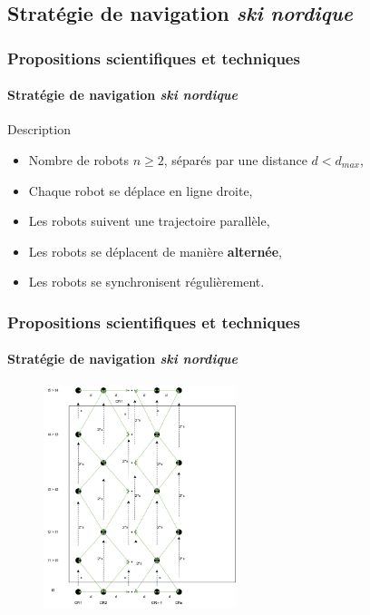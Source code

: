 \documentclass{beamer}
\begin{document}
		\subsection{Stratégie de navigation \textit{ski nordique}}
			\begin{frame}
				\frametitle{Propositions scientifiques et techniques}
				\framesubtitle{Stratégie de navigation \textit{ski nordique}}
				\begin{block}{Description}
					\begin{itemize}
						\item Nombre de robots $n \ge 2$, séparés par une distance $d < d_{max}$,
						\item Chaque robot se déplace en ligne droite,
						\item Les robots suivent une trajectoire parallèle,
						\item Les robots se déplacent de manière \textbf{alternée},
						\item Les robots se synchronisent régulièrement.
					\end{itemize}
				\end{block}
			\end{frame}
			\begin{frame}
				\frametitle{Propositions scientifiques et techniques}
				\framesubtitle{Stratégie de navigation \textit{ski nordique}}
				\begin{figure}
					\centering
					\includegraphics[width=0.5\textwidth]{graphics/ski_nordique_1.png}
				\end{figure}
			\end{frame}
\end{document}
